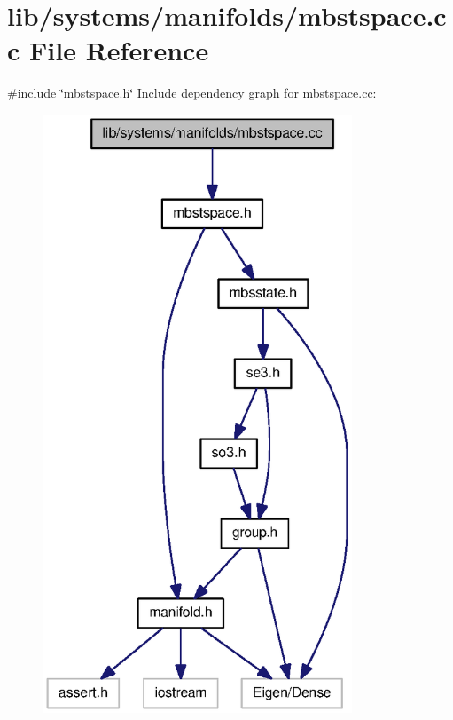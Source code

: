 \section{lib/systems/manifolds/mbstspace.cc \-File \-Reference}
\label{mbstspace_8cc}
{\ttfamily \#include \char`\"{}mbstspace.\-h\char`\"{}}\*
\-Include dependency graph for mbstspace.\-cc\-:\nopagebreak
\begin{figure}[H]
\begin{center}
\leavevmode
\includegraphics[width=262pt]{mbstspace_8cc__incl}
\end{center}
\end{figure}
